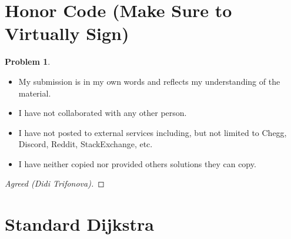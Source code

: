 \documentclass[11pt]{article}
\theoremstyle{definition}
\theoremstyle{definition}
\newtheorem{required}{Problem}
\theoremstyle{definition}
\begin{document}
\section{Honor Code (Make Sure to Virtually Sign)} \label{HonorCode}

\begin{required}
\noindent 
\begin{itemize}
\item My submission is in my own words and reflects my understanding of the material.
\item I have not collaborated with any other person.
\item I have not posted to external services including, but not limited to Chegg, Discord, Reddit, StackExchange, etc.
\item I have neither copied nor provided others solutions they can copy.
\end{itemize}

\end{required}

\begin{proof}[Agreed (Didi Trifonova)]
\end{proof}



\newpage
\section{Standard Dijkstra}
\end{document}

